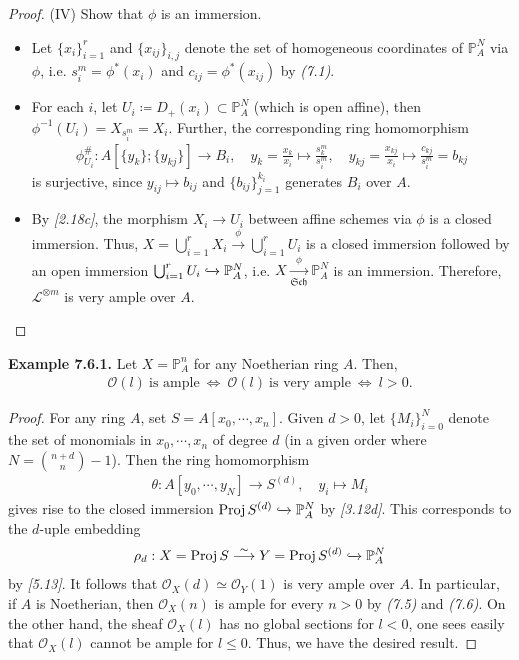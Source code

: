 \documentclass[11pt,a4paper,footinclude=true,headinclude=true]{scrbook} %
\DeclareMathOperator{\Proj}{Proj}
\newcommand{\LL}{\mathscr{L}}
\newcommand{\OO}{\mathcal{O}}
\newcommand{\PP}{\mathbb{P}}
\newcommand{\Sch}{\mathfrak{Sch}}
\newcommand{\<}{\langle}
\newcommand{\>}{\rangle}
\newcommand{\isolongto}{\overset{\sim}{\longrightarrow}}
\newenvironment{example}[2][Example]
    { \begin{mdframed}[backgroundcolor=gray!20] \textbf{#1 #2.} }
    {  \end{mdframed}}
\begin{document}
\begin{proof}
    (IV) Show that $\phi$ is an immersion.
    \begin{itemize}
        \item Let $\{x_i\}_{i=1}^r$ and $\{x_{ij}\}_{i,j}$ denote the set of homogeneous coordinates of $\PP_A^N$ via $\phi$, i.e. $s_i^m=\phi^\ast(x_i)$ and $c_{ij}=\phi^\ast(x_{ij})$ by \textit{(7.1)}. 
        \item For each $i$, let $U_i\coloneqq D_+(x_i)\subset\PP_A^N$ (which is open affine), then $\phi^{-1}(U_i)=X_{s_i^m}=X_i$. Further, the corresponding ring homomorphism
        \begin{align*}
            \phi^{\#}_{U_i}:A[\{y_k\};\{y_{kj}\}]\longrightarrow B_i,\quad y_k=\frac{x_k}{x_i}\longmapsto\frac{s_k^m}{s_i^m},\quad y_{kj}=\frac{x_{kj}}{x_i}\longmapsto\frac{c_{kj}}{s_i^m}=b_{kj}
        \end{align*}
        is surjective, since $y_{ij}\mapsto b_{ij}$ and $\{b_{ij}\}_{j=1}^{k_i}$ generates $B_i$ over $A$.
        \item By \textit{[2.18c]}, the morphism $X_i\to U_i$ between affine schemes via $\phi$ is a closed immersion. Thus, $X=\bigcup_{i=1}^rX_i\xrightarrow{\phi}\bigcup_{i=1}^rU_i$ is a closed immersion followed by an open immersion $\bigcup_{i=1}^rU_i\xhookrightarrow{}\PP_A^N$, i.e. $X\xrightarrow[\Sch]{\phi}\PP_A^N$ is an immersion. Therefore, $\LL^{\otimes m}$ is very ample over $A$.
    \end{itemize}
\end{proof}

\begin{example}{7.6.1}
    Let $X=\PP_A^n$ for any Noetherian ring $A$. Then,
    \begin{align*}
        \OO(l)\ \text{is ample}\ \Longleftrightarrow\ \OO(l)\ \text{is very ample}\ \Longleftrightarrow\ l>0.
    \end{align*}
\end{example}
\begin{proof}
    For any ring $A$, set $S=A[x_0,\cdots,x_n]$. Given $d>0$, let $\{M_i\}_{i=0}^N$ denote the set of monomials in $x_0,\cdots,x_n$ of degree $d$ (in a given order where $N=\binom{n+d}{n}-1$). Then the ring homomorphism 
    \begin{align*}
        \theta:A[y_0,\cdots,y_N]\longrightarrow S^{(d)},\quad y_i\longmapsto M_i
    \end{align*}
    gives rise to the closed immersion $\Proj S^{(d)}\xhookrightarrow{}\PP_A^N$ by \textit{[3.12d]}. This corresponds to the $d$-uple embedding
    \begin{align*}
        \rho_d:X=\Proj S\isolongto Y=\Proj S^{(d)}\xhookrightarrow{}\PP_A^N
    \end{align*}
    by \textit{[5.13]}. It follows that $\OO_X(d)\simeq\OO_Y(1)$ is very ample over $A$. In particular, if $A$ is Noetherian, then $\OO_X(n)$ is ample for every $n>0$ by \textit{(7.5)} and \textit{(7.6)}. On the other hand, the sheaf $\OO_X(l)$ has no global sections for $l<0$, one sees easily that $\OO_X(l)$ cannot be ample for $l\leq0$. Thus, we have the desired result. 
\end{proof}
\end{document}
